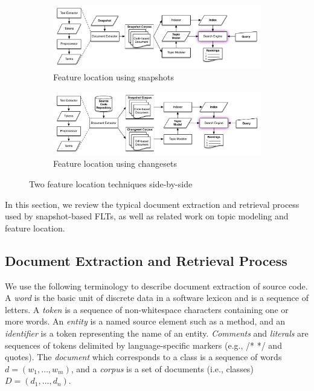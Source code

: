 
\begin{figure}[t]
    \centering
\begin{subfigure}[t]{.9\textwidth}
    \centerline{\includegraphics[width=\textwidth]{figures/snapshot-flt}}
    \caption{Feature location using snapshots}
    \label{fig:snapshot}
\end{subfigure}

\begin{subfigure}[b]{.9\textwidth}
    \centerline{\includegraphics[width=\textwidth]{figures/changeset-flt}}
\caption{Feature location using changesets}
\label{fig:changeset}
\end{subfigure}

\label{fig:flts}
\caption{Two feature location techniques side-by-side}
\end{figure}


In this section, we review the typical document extraction and retrieval process used by snapshot-based FLTs,
as well as related work on topic modeling and feature location.

\subsection{Document Extraction and Retrieval Process}
\label{sec:snapshot-flt}

We use the following terminology to describe document extraction of source code.
A \textit{word} is the basic unit of discrete data in a software lexicon and is a sequence of letters.
A \textit{token} is a sequence of non-whitespace characters containing one or more words.
An \textit{entity} is a named source element such as a method,
and an \textit{identifier} is a token representing the name of an entity.
\textit{Comments} and \textit{literals} are sequences of tokens delimited by language-specific markers (e.g., /* */ and quotes).
The \textit{document} which corresponds to a class is a sequence of words $d = (w_1, \ldots, w_m)$,
and a \textit{corpus} is a set of documents (i.e., classes) $D = (d_1, \ldots, d_n)$.

